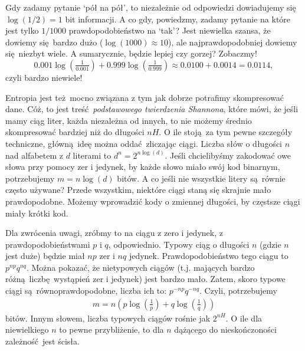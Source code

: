 \documentclass[10pt,a4paper]{article}
\begin{document}
Gdy zadamy pytanie `pół na pół', to niezależnie od odpowiedzi dowiadujemy się $\log(1/2)=1$ bit informacji.
A co gdy, powiedzmy, zadamy pytanie na które jest tylko $1/1000$ prawdopodobieństwo na `tak'?
Jest niewielka szansa, że dowiemy się bardzo dużo ($\log(1000)\approx 10$), ale najprawdopodobniej dowiemy się niezbyt wiele.
A sumarycznie, będzie lepiej czy gorzej? Zobaczmy!
%
\begin{equation}
    0.001 \log(\tfrac{1}{0.001}) + 0.999 \log(\tfrac{1}{0.999})\approx 0.0100 + 0.0014 = 0.0114,
\end{equation}
%
czyli bardzo niewiele!

Entropia jest też mocno związana z tym jak dobrze potrafimy skompresować dane.
Cóż, to jest treść \emph{podstawowego twierdzenia Shannona}, które mówi, że jeśli mamy ciąg liter,
każda niezależna od innych, to nie możemy średnio skompresować bardziej niż do długości $n H$.
O ile stoją za tym pewne szczegóły techniczne, główną ideę można oddać zliczając ciągi.
Liczba słów o długości $n$ nad alfabetem z $d$ literami to $d^n=2^{n \log(d)}$.
Jeśli chcielibyśmy zakodować owe słowa przy pomocy zer i jedynek,
by każde słowo miało swój kod binarnym, potrzebujemy $m = n \log(d)$ bitów.
A co jeśli nie wszystkie litery są równie często używane?
Przede wszystkim, niektóre ciągi staną się skrajnie mało prawdopodobne.
Możemy wprowadzić kody o zmiennej długości, by częstsze ciągi miały krótki kod.

Dla zwrócenia uwagi, zróbmy to na ciągu z zero i jedynek, z prawdopodobieństwami $p$ i $q$, odpowiednio.
Typowy ciąg o długości $n$ (gdzie $n$ jest duże) będzie miał $n p$ zer i $n q$ jedynek.
Prawdopodobieństwo tego ciągu to $p^{n p}q^{n q}$.
Można pokazać, że nietypowych ciągów (t.j. mających bardzo różną liczbę wystąpień zer i jedynek) jest bardzo mało.
Zatem, skoro typowe ciągi są równoprawdopodobne, liczba ich to:
$p^{-n p}q^{-n q}$.
Czyli, potrzebujemy
%
\begin{align}
    m=n \left( p \log(\tfrac{1}{p}) + q \log(\tfrac{1}{q}) \right)
\end{align}
%
bitów.
Innym słowem, liczba typowych ciągów rośnie jak $2^{n H}$.
O ile dla niewielkiego $n$ to pewne przybliżenie, to dla $n$ dążącego do nieskończoności zależność jest ścisła.

\end{document}
